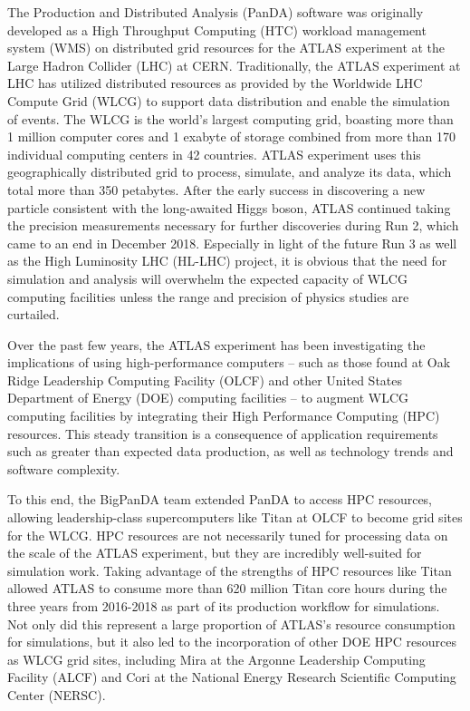 

The Production and Distributed Analysis (PanDA) software was originally
developed as a High Throughput Computing (HTC) workload management system (WMS)
on distributed grid resources for the ATLAS experiment at the Large Hadron
Collider (LHC) at CERN. Traditionally, the ATLAS experiment at LHC has utilized
distributed resources as provided by the Worldwide LHC Compute Grid (WLCG) to
support data distribution and enable the simulation of events. The WLCG is the
world's largest computing grid, boasting more than 1 million computer cores and
1 exabyte of storage combined from more than 170 individual computing centers
in 42 countries. ATLAS experiment uses this geographically distributed grid to
process, simulate, and analyze its data, which total more than 350 petabytes.
After the early success in discovering a new particle consistent with the
long-awaited Higgs boson, ATLAS continued taking the precision measurements
necessary for further discoveries during Run 2, which came to an end in
December 2018. Especially in light of the future Run 3 as well as the High
Luminosity LHC (HL-LHC) project, it is obvious that the need for simulation and
analysis will overwhelm the expected capacity of WLCG computing facilities
unless the range and precision of physics studies are curtailed.

Over the past few years, the ATLAS experiment has been investigating the
implications of using high-performance computers -- such as those found at Oak
Ridge Leadership Computing Facility (OLCF) and other United States Department
of Energy (DOE) computing facilities -- to augment WLCG computing facilities by
integrating their High Performance Computing (HPC) resources. This steady
transition is a consequence of application requirements such as greater than
expected data production, as well as technology trends and software complexity.

To this end, the BigPanDA team extended PanDA to access HPC resources, allowing
leadership-class supercomputers like Titan at OLCF to become grid sites for the
WLCG. HPC resources are not necessarily tuned for processing data on the scale
of the ATLAS experiment, but they are incredibly well-suited for simulation
work. Taking advantage of the strengths of HPC resources like Titan allowed
ATLAS to consume more than 620 million Titan core hours during the three years
from 2016-2018 as part of its production workflow for simulations. Not only did
this represent a large proportion of ATLAS's resource consumption for
simulations, but it also led to the incorporation of other DOE HPC resources as
WLCG grid sites, including Mira at the Argonne Leadership Computing Facility
(ALCF) and Cori at the National Energy Research Scientific Computing Center
(NERSC).

